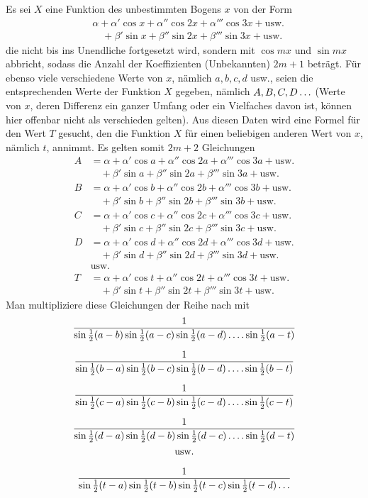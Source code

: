 \begingroup
\renewcommand{\arraystretch}{1.45}
Es sei \(X\) eine Funktion des unbestimmten Bogens \(x\) von der Form
\[
\begin{aligned}
&\alpha+\alpha'\cos x+\alpha''\cos 2x+\alpha'''\cos 3x+\text{usw.}\\
&\quad+\beta'\sin x+\beta''\sin 2x+\beta'''\sin 3x+\text{usw.}
\end{aligned}
\]
die nicht bis ins Unendliche fortgesetzt wird, sondern mit \(\cos mx\) und \(\sin mx\) abbricht, sodass
die Anzahl der Koeffizienten (Unbekannten) \(2m+1\) beträgt. Für ebenso viele verschiedene Werte von \(x\), nämlich \(a,b,c,d\) usw., seien die entsprechenden Werte der Funktion \(X\) gegeben,
nämlich \(A,B,C,D\mathinner{.\,.\,.}\) (Werte von \(x\), deren Differenz ein ganzer Umfang oder ein Vielfaches davon ist, können hier offenbar nicht als verschieden gelten). Aus
diesen Daten wird eine Formel für den Wert \(T\) gesucht, den die Funktion \(X\) für einen beliebigen anderen
Wert von \(x\), nämlich \(t\), annimmt. Es gelten somit \(2m+2\) Gleichungen
\[
\begin{aligned}
A&=\alpha+\alpha'\cos a+\alpha''\cos 2a+\alpha'''\cos 3a+\text{usw.}\\
 &\quad+\beta'\sin a+\beta''\sin 2a+\beta'''\sin 3a+\text{usw.}\\
B&=\alpha+\alpha'\cos b+\alpha''\cos 2b+\alpha'''\cos 3b+\text{usw.}\\
 &\quad+\beta'\sin b+\beta''\sin 2b+\beta'''\sin 3b+\text{usw.}\\
C&=\alpha+\alpha'\cos c+\alpha''\cos 2c+\alpha'''\cos 3c+\text{usw.}\\
 &\quad+\beta'\sin c+\beta''\sin 2c+\beta'''\sin 3c+\text{usw.}\\
D&=\alpha+\alpha'\cos d+\alpha''\cos 2d+\alpha'''\cos 3d+\text{usw.}\\
 &\quad+\beta'\sin d+\beta''\sin 2d+\beta'''\sin 3d+\text{usw.}\\
 &\text{usw.}\\
T&=\alpha+\alpha'\cos t+\alpha''\cos 2t+\alpha'''\cos 3t+\text{usw.}\\
 &\quad+\beta'\sin t+\beta''\sin 2t+\beta'''\sin 3t+\text{usw.}
\end{aligned}
\]
Man multipliziere diese Gleichungen der Reihe nach mit
\[
\begin{gathered}
\frac{1}{\sin\tfrac12(a-b)\sin\tfrac12(a-c)\sin\tfrac12(a-d)\mathinner{.\,.\,.\,.}\sin\tfrac12(a-t)}\\[6pt]
\frac{1}{\sin\tfrac12(b-a)\sin\tfrac12(b-c)\sin\tfrac12(b-d)\mathinner{.\,.\,.\,.}\sin\tfrac12(b-t)}\\[6pt]
\frac{1}{\sin\tfrac12(c-a)\sin\tfrac12(c-b)\sin\tfrac12(c-d)\mathinner{.\,.\,.\,.}\sin\tfrac12(c-t)}\\[6pt]
\frac{1}{\sin\tfrac12(d-a)\sin\tfrac12(d-b)\sin\tfrac12(d-c)\mathinner{.\,.\,.\,.}\sin\tfrac12(d-t)}\\
\text{usw.}\\[6pt]
\frac{1}{\sin\tfrac12(t-a)\sin\tfrac12(t-b)\sin\tfrac12(t-c)\sin\tfrac12(t-d)\mathinner{.\,.\,.}}
\end{gathered}
\]
